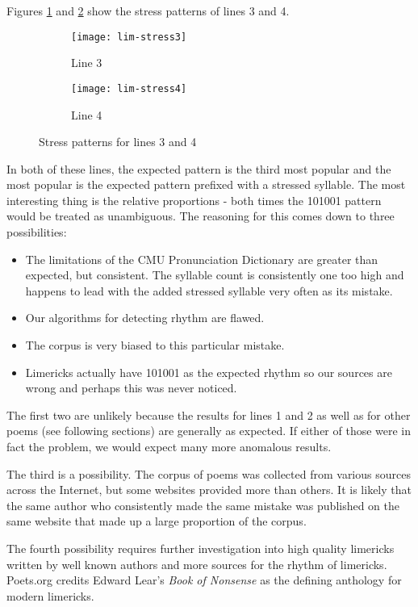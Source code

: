 \begin{description}
Figures \ref{fig:lim-stress3} and \ref{fig:lim-stress4} show the stress patterns of lines 3 and 4. 

\begin{figure}[H]
\centering
\begin{subfigure}[t]{0.5\textwidth}
	\centering
    \texttt{[image: lim-stress3]}
    \caption{Line 3}
    \label{fig:lim-stress3}
\end{subfigure}
\begin{subfigure}[t]{0.5\textwidth}
	\centering
    \texttt{[image: lim-stress4]}
    \caption{Line 4}
    \label{fig:lim-stress4}
\end{subfigure}
\caption{Stress patterns for lines 3 and 4}
\label{fig:lim4}
\end{figure}

In both of these lines, the expected pattern is the third most popular and the most popular is the expected pattern prefixed with a stressed syllable. The most interesting thing is the relative proportions - both times the 101001 pattern would be treated as unambiguous. The reasoning for this comes down to three possibilities:
\begin{itemize}
\item{The limitations of the CMU Pronunciation Dictionary are greater than expected, but consistent. The syllable count is consistently one too high and happens to lead with the added stressed syllable very often as its mistake.}
\item{Our algorithms for detecting rhythm are flawed.}
\item{The corpus is very biased to this particular mistake.}
\item{Limericks actually have 101001 as the expected rhythm so our sources are wrong and perhaps this was never noticed.}
\end{itemize}

The first two are unlikely because the results for lines 1 and 2 as well as for other poems (see following sections) are generally as expected. If either of those were in fact the problem, we would expect many more anomalous results.

The third is a possibility. The corpus of poems was collected from various sources across the Internet, but some websites provided more than others. It is likely that the same author who consistently made the same mistake was published on the same website that made up a large proportion of the corpus.

The fourth possibility requires further investigation into high quality limericks written by well known authors and more sources for the rhythm of limericks. Poets.org credits Edward Lear's \textit{Book of Nonsense}\cite{lear1894book} as the defining anthology for modern limericks.


\end{description}
